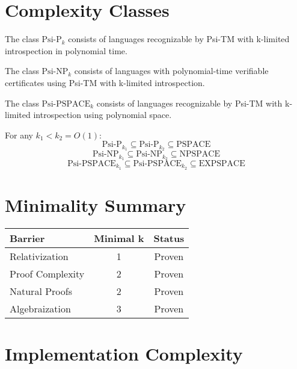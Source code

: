\documentclass[11pt]{article}
\begin{document}
\section{Complexity Classes}

\begin{definition}
The class $\text{Psi-P}_k$ consists of languages recognizable by Psi-TM with k-limited introspection in polynomial time.
\end{definition}

\begin{definition}
The class $\text{Psi-NP}_k$ consists of languages with polynomial-time verifiable certificates using Psi-TM with k-limited introspection.
\end{definition}

\begin{definition}
The class $\text{Psi-PSPACE}_k$ consists of languages recognizable by Psi-TM with k-limited introspection using polynomial space.
\end{definition}

\begin{theorem}
For any $k_1 < k_2 = O(1)$:
$$\text{Psi-P}_{k_1} \subseteq \text{Psi-P}_{k_2} \subseteq \text{PSPACE}$$
$$\text{Psi-NP}_{k_1} \subseteq \text{Psi-NP}_{k_2} \subseteq \text{NPSPACE}$$
$$\text{Psi-PSPACE}_{k_1} \subseteq \text{Psi-PSPACE}_{k_2} \subseteq \text{EXPSPACE}$$
\end{theorem}

\section{Minimality Summary}

\begin{center}
\begin{tabular}{|l|c|c|}
\hline
\textbf{Barrier} & \textbf{Minimal k} & \textbf{Status} \\
\hline
Relativization & 1 & Proven \\
Proof Complexity & 2 & Proven \\
Natural Proofs & 2 & Proven \\
Algebraization & 3 & Proven \\
\hline
\end{tabular}
\end{center}

\section{Implementation Complexity}
\end{document}
